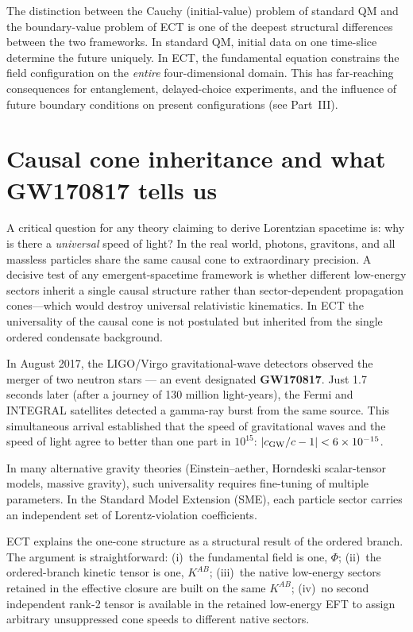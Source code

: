 \documentclass[11pt,a4paper]{article}
\begin{document}
The distinction between the Cauchy (initial-value) problem of standard QM and the boundary-value problem of ECT is one of the deepest structural differences between the two frameworks. In standard QM, initial data on one time-slice determine the future uniquely. In ECT, the fundamental equation constrains the field configuration on the \emph{entire} four-dimensional domain. This has far-reaching consequences for entanglement, delayed-choice experiments, and the influence of future boundary conditions on present configurations (see Part~III).

\FloatBarrier

\section{Causal cone inheritance and what GW170817 tells us}
\label{sec:pop_cone}

A critical question for any theory claiming to derive Lorentzian spacetime is: why is there a \emph{universal} speed of light? In the real world, photons, gravitons, and all massless particles share the same causal cone to extraordinary precision. A decisive test of any emergent-spacetime framework is whether different low-energy sectors inherit a single causal structure rather than sector-dependent propagation cones---which would destroy universal relativistic kinematics. In ECT the universality of the causal cone is not postulated but inherited from the single ordered condensate background.

In August 2017, the LIGO/Virgo gravitational-wave detectors observed the merger of two neutron stars --- an event designated \textbf{GW170817}. Just 1.7 seconds later (after a journey of 130 million light-years), the Fermi and INTEGRAL satellites detected a gamma-ray burst from the same source. This simultaneous arrival established that the speed of gravitational waves and the speed of light agree to better than one part in $10^{15}$: $|c_{\rm GW}/c - 1| < 6 \times 10^{-15}$.

In many alternative gravity theories (Einstein--aether, Horndeski scalar-tensor models, massive gravity), such universality requires fine-tuning of multiple parameters. In the Standard Model Extension (SME), each particle sector carries an independent set of Lorentz-violation coefficients.

ECT explains the one-cone structure as a structural result of the ordered branch. The argument is straightforward:
(i)~the fundamental field is one, $\Phi$;
(ii)~the ordered-branch kinetic tensor is one, $K^{AB}$;
(iii)~the native low-energy sectors retained in the effective closure are built on the same $K^{AB}$;
(iv)~no second independent rank-2 tensor is available in the retained low-energy EFT to assign arbitrary unsuppressed cone speeds to different native sectors.
\end{document}
